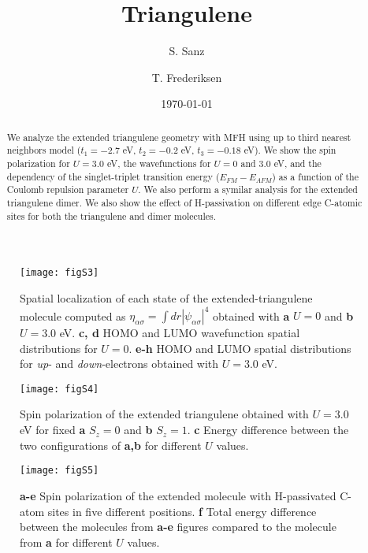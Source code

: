 \documentclass[twocolumn,amsmath,%
amssymb,prb,superscriptaddress]{revtex4}
\begin{document}
\title{Triangulene}

\author{S. Sanz}

\author{T. Frederiksen}

\date{\today}

\begin{abstract}
We analyze the extended triangulene geometry with MFH using up to third nearest neighbors model ($t_{1}=-2.7$ eV, $t_{2}=-0.2$ eV, $t_{3}=-0.18$ eV). We show the spin polarization for $ U=3.0$ eV, the wavefunctions for $U=0$ and $3.0$ eV, and the dependency of the singlet-triplet transition energy ($E_{FM}-E_{AFM}$) as a function of the Coulomb repulsion parameter $U$. We also perform a symilar analysis for the extended triangulene dimer. We also show the effect of H-passivation on different edge C-atomic sites for both the triangulene and dimer molecules.
\end{abstract}

\maketitle


\begin{figure*}
	\texttt{[image: figS3]}
	\caption{Spatial localization of each state of the extended-triangulene molecule computed as $\eta_{\alpha\sigma}=\int dr|\psi_{\alpha\sigma}|^{4}$ obtained with \textbf{a} $U=0$ and \textbf{b} $U=3.0$ eV. \textbf{c, d} HOMO and LUMO wavefunction spatial distributions for $U=0$. \textbf{e-h} HOMO and LUMO spatial distributions for \emph{up}- and \emph{down}-electrons obtained with $U=3.0$ eV.}
\end{figure*}

\begin{figure*}
	\texttt{[image: figS4]}
	\caption{Spin polarization of the extended triangulene obtained with $U=3.0$ eV for fixed \textbf{a} $S_{z}=0$ and \textbf{b} $S_{z}=1$. \textbf{c} Energy difference between the two configurations of \textbf{a,b} for different $U$ values.}
\end{figure*}

\begin{figure*}
	\texttt{[image: figS5]}
	\caption{\textbf{a-e} Spin polarization of the extended molecule with H-passivated C-atom sites in five different positions. \textbf{f} Total energy difference between the molecules from \textbf{a-e} figures compared to the molecule from \textbf{a} for different $U$ values.}
\end{figure*}
\end{document}
